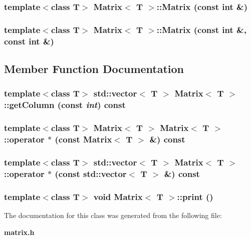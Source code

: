 \subsubsection{\setlength{\rightskip}{0pt plus 5cm}template$<$class T$>$ Matrix$<$ T $>$::Matrix (const int \&)}\label{classMatrix_a1}


\subsubsection{\setlength{\rightskip}{0pt plus 5cm}template$<$class T$>$ Matrix$<$ T $>$::Matrix (const int \&, const int \&)}\label{classMatrix_a2}




\subsection{Member Function Documentation}
\subsubsection{\setlength{\rightskip}{0pt plus 5cm}template$<$class T$>$ {\bf std::vector}$<$ T $>$ Matrix$<$ T $>$::get\-Column (const {\em int}) const}\label{classMatrix_a4}


\subsubsection{\setlength{\rightskip}{0pt plus 5cm}template$<$class T$>$ Matrix$<$ T $>$ Matrix$<$ T $>$::operator $\ast$ (const Matrix$<$ T $>$ \&) const}\label{classMatrix_a5}


\subsubsection{\setlength{\rightskip}{0pt plus 5cm}template$<$class T$>$ {\bf std::vector}$<$ T $>$ Matrix$<$ T $>$::operator $\ast$ (const {\bf std::vector}$<$ T $>$ \&) const}\label{classMatrix_a3}


\subsubsection{\setlength{\rightskip}{0pt plus 5cm}template$<$class T$>$ void Matrix$<$ T $>$::print ()}\label{classMatrix_a6}




The documentation for this class was generated from the following file:\begin{CompactItemize}
\item 
{\bf matrix.h}\end{CompactItemize}
